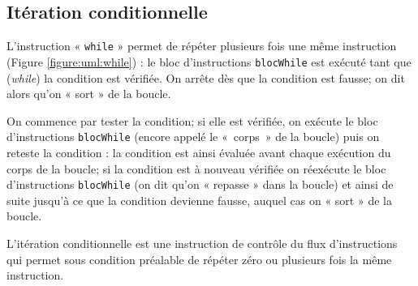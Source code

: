 \subsection{Itération conditionnelle}

L'instruction « {\tt while} » permet de répéter plusieurs fois une même instruction 
(Figure \ref{figure:uml:while}) : le bloc d'instructions {\tt blocWhile} est exécuté 
tant que (\emph{while}) la condition est vérifiée. On arrête dès que la condition est fausse; 
on dit alors qu'on « sort » de la boucle. 

On commence par tester la condition; si elle
est vérifiée, on exécute le bloc d'instructions {\tt blocWhile} 
(encore appelé le «~corps~» de la boucle) puis on reteste la condition : 
la condition est ainsi évaluée avant chaque exécution du corps 
de la boucle; si la condition est à nouveau vérifiée on réexécute le bloc 
d'instructions {\tt blocWhile} (on dit qu'on « repasse » dans la boucle)
et ainsi de suite jusqu'à ce que la condition devienne fausse, 
auquel cas on « sort » de la boucle.

\begin{definition}
L'itération conditionnelle est une instruction de contrôle du flux d'instructions
qui permet sous condition préalable de répéter zéro ou plusieurs fois la même instruction.
\end{definition}

